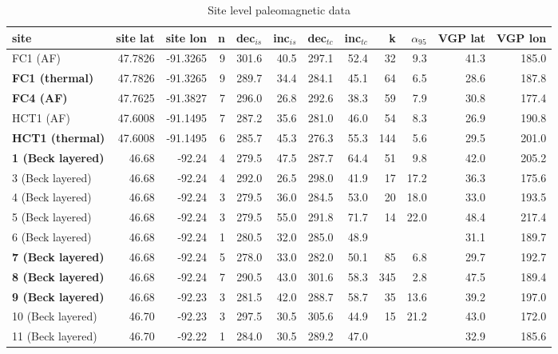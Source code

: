 \documentclass[11pt,letterpaper]{article}
\begin{document}


\begin{table}[h!]
\tiny
\caption{Site level paleomagnetic data}
\begin{tabular}{|l|r|r|r|r|r|r|r|r|r|r|r|}
\hline
site & site lat & site lon & n & dec$_{is}$ & inc$_{is}$ & dec$_{tc}$ & inc$_{tc}$ & k & $\alpha_{95}$ & VGP lat & VGP lon \\
\hline
	FC1 (AF)		&	47.7826	&	-91.3265	&	9	&	301.6	&	40.5	&	297.1	&	52.4	&	32	&	9.3	&	41.3	&	185.0	\\
\textbf{FC1 (thermal)	}	&	47.7826	&	-91.3265	&	9	&	289.7	&	34.4	&	284.1	&	45.1	&	64	&	6.5	&	28.6	&	187.8	\\
\textbf{FC4 (AF)	}	&	47.7625	&	-91.3827	&	7	&	296.0	&	26.8	&	292.6	&	38.3	&	59	&	7.9	&	30.8	&	177.4	\\
	HCT1 (AF)		&	47.6008	&	-91.1495	&	7	&	287.2	&	35.6	&	281.0	&	46.0	&	54	&	8.3	&	26.9	&	190.8	\\
\textbf{HCT1 (thermal)	}	&	47.6008	&	-91.1495	&	6	&	285.7	&	45.3	&	276.3	&	55.3	&	144	&	5.6	&	29.5	&	201.0	\\
\textbf{1 (Beck layered)	}	&	46.68	&	-92.24	&	4	&	279.5	&	47.5	&	287.7	&	64.4	&	51	&	9.8	&	42.0	&	205.2	\\
	3 (Beck layered)		&	46.68	&	-92.24	&	4	&	292.0	&	26.5	&	298.0	&	41.9	&	17	&	17.2	&	36.3	&	175.6	\\
	4 (Beck layered)		&	46.68	&	-92.24	&	3	&	279.5	&	36.0	&	284.5	&	53.0	&	20	&	18.0	&	33.0	&	193.5	\\
	5 (Beck layered)		&	46.68	&	-92.24	&	3	&	279.5	&	55.0	&	291.8	&	71.7	&	14	&	22.0	&	48.4	&	217.4	\\
	6 (Beck layered)		&	46.68	&	-92.24	&	1	&	280.5	&	32.0	&	285.0	&	48.9	&		&		&	31.1	&	189.7	\\
\textbf{7 (Beck layered)	}	&	46.68	&	-92.24	&	5	&	278.0	&	33.0	&	282.0	&	50.1	&	85	&	6.8	&	29.7	&	192.7	\\
\textbf{8 (Beck layered)	}	&	46.68	&	-92.24	&	7	&	290.5	&	43.0	&	301.6	&	58.3	&	345	&	2.8	&	47.5	&	189.4	\\
\textbf{9 (Beck layered)	}	&	46.68	&	-92.23	&	3	&	281.5	&	42.0	&	288.7	&	58.7	&	35	&	13.6	&	39.2	&	197.0	\\
	10 (Beck layered)		&	46.70	&	-92.23	&	3	&	297.5	&	30.5	&	305.6	&	44.9	&	15	&	21.2	&	43.0	&	172.0	\\
	11 (Beck layered)		&	46.70	&	-92.22	&	1	&	284.0	&	30.5	&	289.2	&	47.0	&		&		&	32.9	&	185.6	\\

\end{tabular}
\end{table}
\end{document}
